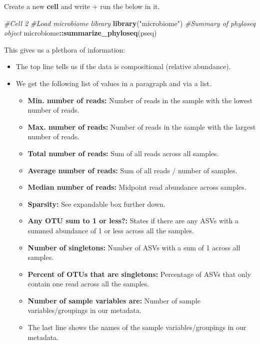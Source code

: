 \documentclass[
]{book}
\newenvironment{Shaded}{\begin{snugshade}}{\end{snugshade}}
\newcommand{\CommentTok}[1]{\textcolor[rgb]{0.56,0.35,0.01}{\textit{#1}}}
\newcommand{\FunctionTok}[1]{\textcolor[rgb]{0.13,0.29,0.53}{\textbf{#1}}}
\newcommand{\NormalTok}[1]{#1}
\newcommand{\SpecialCharTok}[1]{\textcolor[rgb]{0.81,0.36,0.00}{\textbf{#1}}}
\newcommand{\StringTok}[1]{\textcolor[rgb]{0.31,0.60,0.02}{#1}}
\providecommand{\tightlist}{%
  \setlength{\itemsep}{0pt}\setlength{\parskip}{0pt}}
\begin{document}
Create a new \textbf{cell} and write + run the below in it.

\begin{Shaded}
\begin{Highlighting}[]
\CommentTok{\#Cell 2}
\CommentTok{\#Load microbiome library}
\FunctionTok{library}\NormalTok{(}\StringTok{"microbiome"}\NormalTok{)}
\CommentTok{\#Summary of phyloseq object}
\NormalTok{microbiome}\SpecialCharTok{::}\FunctionTok{summarize\_phyloseq}\NormalTok{(pseq)}
\end{Highlighting}
\end{Shaded}

This gives us a plethora of information:

\begin{itemize}
\tightlist
\item
  The top line tells us if the data is compositional (relative abundance).
\item
  We get the following list of values in a paragraph and via a list.

  \begin{itemize}
  \tightlist
  \item
    \textbf{Min. number of reads:} Number of reads in the sample with the lowest number of reads.
  \item
    \textbf{Max. number of reads:} Number of reads in the sample with the largest number of reads.
  \item
    \textbf{Total number of reads:} Sum of all reads across all samples.
  \item
    \textbf{Average number of reads:} Sum of all reads / number of samples.
  \item
    \textbf{Median number of reads:} Midpoint read abundance across samples.
  \item
    \textbf{Sparsity:} See expandable box further down.
  \item
    \textbf{Any OTU sum to 1 or less?:} States if there are any ASVs with a summed abundance of 1 or less across all the samples.
  \item
    \textbf{Number of singletons:} Number of ASVs with a sum of 1 across all samples.
  \item
    \textbf{Percent of OTUs that are singletons:} Percentage of ASVs that only contain one read across all the samples.
  \item
    \textbf{Number of sample variables are:} Number of sample variables/groupings in our metadata.
  \item
    The last line shows the names of the sample variables/groupings in our metadata.
  \end{itemize}
\end{itemize}
\end{document}
